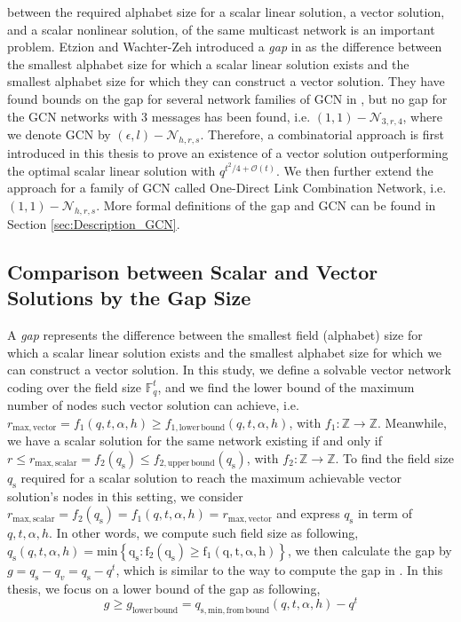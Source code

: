 between the required alphabet size for a scalar linear solution, a
vector solution, and a scalar nonlinear solution, of the same multicast
network is an important problem. Etzion and Wachter-Zeh introduced
a \textit{gap} in \cite{Etzion:2016} as the difference between the
smallest alphabet size for which a scalar linear solution exists and
the smallest alphabet size for which they can construct a vector solution.
They have found bounds on the gap for several network families of
GCN in \cite{Etzion:2016,Wachter-Zeh:2018}, but no gap for the GCN
networks with 3 messages has been found, i.e. $(1,1)-\mathcal{N}_{3,r,4}$,
where we denote GCN by $(\epsilon,l)-\mathcal{N}_{h,r,s}$. Therefore,
a combinatorial approach is first introduced in this thesis to prove
an existence of a vector solution outperforming the optimal scalar
linear solution with $q^{t^{2}/4+\mathcal{O}(t)}$. We then further
extend the approach for a family of GCN called One-Direct Link Combination
Network, i.e. $(1,1)-\mathcal{N}_{h,r,s}$. More formal definitions
of the gap and GCN can be found in Section \ref{sec:Description_GCN}.

\subsection{Comparison between Scalar and Vector Solutions by the Gap Size \label{subsec:Comparison-between-scalar-and-vector-sol}}

A \textit{gap} represents the difference between the smallest field
(alphabet) size for which a scalar linear solution exists and the
smallest alphabet size for which we can construct a vector solution.
In this study, we define a solvable vector network coding over the
field size $\ensuremath{\mathbb{F}}_{q}^{t}$, and we find the lower
bound of the maximum number of nodes such vector solution can achieve,
i.e. $r_{\mathrm{max,vector}}=f_{\mathrm{1}}(q,t,\alpha,h)\geq f_{\mathrm{1,lower\,bound}}\left(q,t,\alpha,h\right)$,
with $f_{\mathrm{1}}:\mathbb{Z}\rightarrow\mathbb{Z}$. Meanwhile,
we have a scalar solution for the same network existing if and only
if $r\leq r_{\mathrm{max,scalar}}=f_{\mathrm{2}}\left(q_{\mathrm{s}}\right)\leq f_{\mathrm{2,upper\,bound}}\left(q_{\mathrm{s}}\right)$,
with $f_{\mathrm{2}}:\mathbb{Z}\rightarrow\mathbb{Z}$. To find the
field size $q_{\mathrm{s}}$ required for a scalar solution to reach
the maximum achievable vector solution's nodes in this setting, we
consider $r_{\mathrm{max,scalar}}=f_{\mathrm{2}}\left(q_{\mathrm{s}}\right)=f_{\mathrm{1}}(q,t,\alpha,h)=r_{\mathrm{max,vector}}$
and express $q_{\mathrm{s}}$ in term of $q,t,\alpha,h$. In other
words, we compute such field size as following, $q_{\mathrm{s}}\left(q,t,\alpha,h\right)=\mathrm{\mathrm{min}\left\{ q_{\mathrm{s}}:f_{\mathrm{2}}\left(q_{\mathrm{s}}\right)\geq f_{\mathrm{1}}\left(q,t,\alpha,h\right)\right\} }$,
we then calculate the gap by $g=q_{\mathrm{s}}-q_{v}=q_{\mathrm{s}}-q^{t}$,
which is similar to the way to compute the gap in \cite{Wachter-Zeh:2018}.
In this thesis, we focus on a lower bound of the gap as following,
\[
g\geq g_{\mathrm{lower\,bound}}=q_{\mathrm{s,min,from\,bound}}(q,t,\alpha,h)-q^{t}
\]

